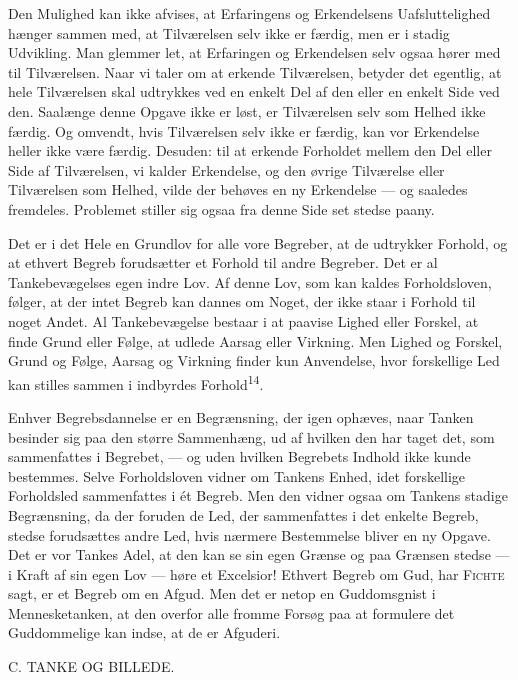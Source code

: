 \documentclass[12pt,a4paper,openany]{book}
\newcommand{\opage}[1]{\marginnote{\footnotesize\textit{[#1]}}}
\begin{document}
Den Mulighed kan ikke afvises, at Erfaringens og Erkendelsens
Uafsluttelighed hænger sammen med, at Tilværelsen selv ikke er færdig,
men er i stadig Udvikling. Man glemmer let, at Erfaringen og Erkendelsen
selv ogsaa hører med til Tilværelsen. Naar vi taler om at erkende
Tilværelsen, betyder det egentlig, at hele Tilværelsen skal udtrykkes
ved en enkelt Del af den eller en enkelt Side ved den. Saalænge denne
Opgave ikke er løst, er Tilværelsen selv som Helhed ikke færdig. Og
omvendt, hvis Tilværelsen selv ikke er færdig, kan vor Erkendelse heller
ikke være færdig. Desuden: til at erkende Forholdet mellem den Del eller
Side af Tilværelsen, vi kalder Erkendelse, og den øvrige Tilværelse
eller Tilværelsen som Helhed, vilde der behøves en ny Erkendelse --- og
saaledes fremdeles. Problemet stiller sig ogsaa fra denne Side set
stedse paany.

Det er i det Hele en Grundlov for alle vore Begreber, at de udtrykker
Forhold, og at ethvert Begreb forudsætter et Forhold til andre Begreber.
Det er al Tankebevægelses egen indre Lov. Af denne Lov, som kan kaldes
Forholdsloven, følger, at der intet Begreb kan dannes om Noget, der ikke
staar i Forhold til noget Andet. Al Tankebevægelse bestaar i at paavise
Lighed eller Forskel, at finde Grund eller Følge, at udlede Aarsag eller
Virkning. Men Lighed og Forskel, Grund og Følge, Aarsag og Virkning
finder kun Anvendelse, hvor forskellige Led kan stilles sammen i
indbyrdes Forhold\textsuperscript{14}.

Enhver Begrebsdannelse er en Begrænsning, der igen ophæves, naar Tanken
besinder sig paa den større Sammenhæng, ud af hvilken den har taget det,
som sammenfattes i Begrebet, --- og uden hvilken Begrebets Indhold ikke
kunde bestemmes. Selve Forholdsloven vidner om Tankens Enhed, idet
forskellige Forholdsled sammenfattes i ét Begreb. Men den vidner ogsaa
om Tankens stadige Begrænsning, da der foruden de Led, der sammenfattes
i det enkelte Begreb, stedse forudsættes andre Led, hvis nærmere
Bestemmelse bliver en ny Opgave. Det er vor Tankes Adel, at den kan se
sin egen Grænse og paa Grænsen stedse --- i Kraft af sin egen Lov ---
høre et Excelsior! Ethvert Begreb om Gud, har \textsc{Fichte} sagt, er
et Begreb om en Afgud. Men det er netop en Guddomsgnist i
Mennesketanken, at den overfor alle fromme Forsøg paa at formulere det
Guddommelige kan indse, at de er Afguderi.

\clearpage

\opage{39}\begin{center}C. TANKE OG BILLEDE.\end{center}
\end{document}
